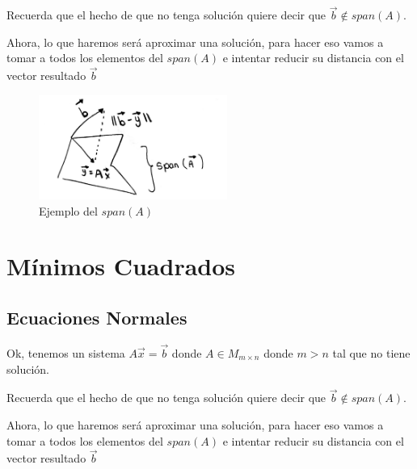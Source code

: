 \documentclass[12pt, fleqn]{report}                             %
\theoremstyle{break}                                            %
\begin{document}
            Recuerda que el hecho de que no tenga solución quiere decir que $\vec b \notin span(A)$.

            Ahora, lo que haremos será aproximar una solución, para hacer eso vamos a tomar a todos
            los elementos del $span(A)$ e intentar reducir su distancia con el vector resultado $\vec b$

            \begin{figure}[h]
                \includegraphics[width=0.55\textwidth]{FindSpanB}
                \caption{Ejemplo del $span(A)$}
            \end{figure}


    \chapter{Mínimos Cuadrados}

        \clearpage
        \section{Ecuaciones Normales}

            Ok, tenemos un sistema $A \vec x = \vec b$ donde $A \in M_{m \times n}$ donde $m > n$
            tal que no tiene solución.

            Recuerda que el hecho de que no tenga solución quiere decir que $\vec b \notin span(A)$.

            Ahora, lo que haremos será aproximar una solución, para hacer eso vamos a tomar a todos
            los elementos del $span(A)$ e intentar reducir su distancia con el vector resultado $\vec b$

\end{document}
